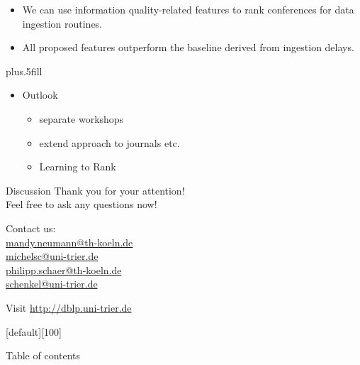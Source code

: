 \documentclass[xcolor={svgnames}]{beamer}
\makeatletter
\newcommand*{\currentname}{\@currentlabelname}
\makeatother
\begin{document}
\begin{frame}{\currentname}\linespread{1.5}

  \begin{itemize}
    \item
      We can use information quality-related features to rank conferences for data ingestion routines.
    \item
    All proposed features outperform the baseline derived from ingestion delays.
  \end{itemize}

  \vskip0pt plus.5fill
  \begin{itemize}
  \item
    Outlook
    \begin{itemize}
    \item separate workshops
    \item extend approach to journals etc.
    \item Learning to Rank
    \end{itemize}
  \end{itemize}
\end{frame}


\begin{frame}{Discussion}
Thank you for your attention!\\
Feel free to ask any questions now!\bigskip

Contact us:\\
\url{mandy.neumann@th-koeln.de}\\
\url{michelsc@uni-trier.de}\\
\url{philipp.schaer@th-koeln.de}\\
\url{schenkel@uni-trier.de}\bigskip

Visit \url{http://dblp.uni-trier.de}

\end{frame}


[default][100]
  \begin{frame}{Table of contents}
  	\tableofcontents[
      currentsection,
      currentsubsection,
      subsectionstyle=hide
    ]
  \end{frame}
\end{document}
